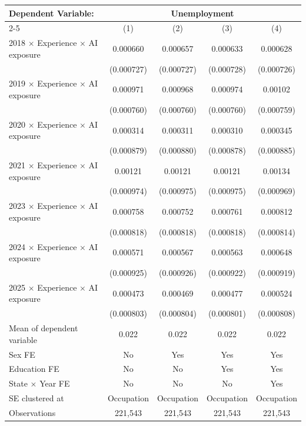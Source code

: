 \def\sym#1{\ifmmode^{#1}\else\(^{#1}\)\fi}
\begin{tabular}{l*{4}{c}}
\toprule
Dependent Variable: & \multicolumn{4}{c}{Unemployment} \\
\cmidrule(lr){2-5}
 & (1) & (2) & (3) & (4) \\
\midrule
2018 $\times$ Experience $\times$ AI exposure&    0.000660   &    0.000657   &    0.000633   &    0.000628   \\
            &  (0.000727)   &  (0.000727)   &  (0.000728)   &  (0.000726)   \\
2019 $\times$ Experience $\times$ AI exposure&    0.000971   &    0.000968   &    0.000974   &     0.00102   \\
            &  (0.000760)   &  (0.000760)   &  (0.000760)   &  (0.000759)   \\
2020 $\times$ Experience $\times$ AI exposure&    0.000314   &    0.000311   &    0.000310   &    0.000345   \\
            &  (0.000879)   &  (0.000880)   &  (0.000878)   &  (0.000885)   \\
2021 $\times$ Experience $\times$ AI exposure&     0.00121   &     0.00121   &     0.00121   &     0.00134   \\
            &  (0.000974)   &  (0.000975)   &  (0.000975)   &  (0.000969)   \\
2023 $\times$ Experience $\times$ AI exposure&    0.000758   &    0.000752   &    0.000761   &    0.000812   \\
            &  (0.000818)   &  (0.000818)   &  (0.000818)   &  (0.000814)   \\
2024 $\times$ Experience $\times$ AI exposure&    0.000571   &    0.000567   &    0.000563   &    0.000648   \\
            &  (0.000925)   &  (0.000926)   &  (0.000922)   &  (0.000919)   \\
2025 $\times$ Experience $\times$ AI exposure&    0.000473   &    0.000469   &    0.000477   &    0.000524   \\
            &  (0.000803)   &  (0.000804)   &  (0.000801)   &  (0.000808)   \\
\midrule
Mean of dependent variable&       0.022   &       0.022   &       0.022   &       0.022   \\
Sex FE      &          No   &         Yes   &         Yes   &         Yes   \\
Education FE&          No   &          No   &         Yes   &         Yes   \\
State $\times$ Year FE&          No   &          No   &          No   &         Yes   \\
SE clustered at&  Occupation   &  Occupation   &  Occupation   &  Occupation   \\
Observations&     221,543   &     221,543   &     221,543   &     221,543   \\
\bottomrule
\end{tabular}
